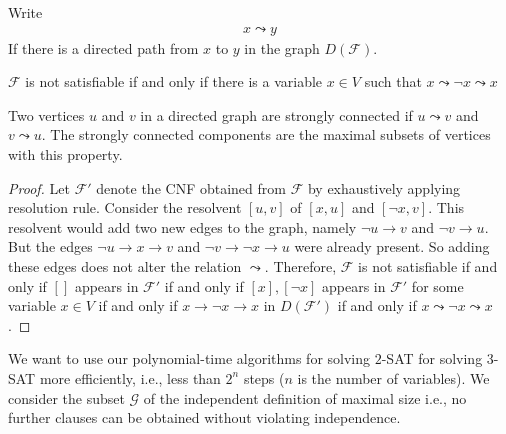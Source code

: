 \documentclass[a4paper]{article}
\theoremstyle{plain}
\newtheorem{lem}[thm]{Lemma}
\theoremstyle{definition}
\newtheorem{defn}{Definition}[section]
\theoremstyle{remark}
\begin{document}
\begin{tcolorbox}[colback=black!3!white,colframe=black!60!white,title=\begin{defn}Directed Path \label{Directed Path}\end{defn}]
Write
\begin{align}
x \leadsto y
\end{align}
If there is a directed path from $x$ to $y$ in the graph $D(\mathcal{F})$.
\end{tcolorbox}
\begin{tcolorbox}[colback=black!3!white,colframe=black!60!white,title=\begin{lem}Satisfiability for linear time \label{Satisfiability for linear time}\end{lem}]
        $\mathcal{F}$ is not satisfiable if and only if there is a variable $x \in V$ such that $x \leadsto \neg x \leadsto x$
\end{tcolorbox}
\begin{tcolorbox}[colback=black!3!white,colframe=black!60!white,title=\begin{defn}Strongly Connected \label{Strongly Connected}\end{defn}]
Two vertices $u$ and $v$ in a directed graph are strongly connected if $u \leadsto v$ and $v \leadsto u$. The strongly connected components are the maximal subsets of vertices with this property.
\begin{proof}
	Let $\mathcal{F}'$ denote the CNF obtained from $\mathcal{F}$ by exhaustively applying resolution rule. Consider the resolvent $[u,v]$ of $[x,u]$ and $[\neg x,v]$. This resolvent would add two new edges to the graph, namely $\neg u \to v$ and $\neg v \to  u$. But the edges $\neg u \to  x \to  v$ and $\neg v \to  \neg x \to  u$ were already present. So adding these edges does not alter the relation $\leadsto$.  Therefore, $\mathcal{F}$ is not satisfiable if and only if $[]$ appears in $\mathcal{F}'$ if and only if $[x], [\neg x]$ appears in $\mathcal{F}'$ for some variable $x \in V$ if and only if $x \to  \neg x \to x$ in $D(\mathcal{F}')$ if and only if  $x \leadsto \neg x \leadsto x$.
\end{proof}
\end{tcolorbox}
\begin{tcolorbox}[colback=black!3!white,colframe=black!60!white,title=\begin{defn}Applications to 3-SAT \label{Applications to 3-SAT}\end{defn}]
We want to use our polynomial-time algorithms for solving $2$-SAT for solving $3$-SAT more efficiently, i.e., less than $2^{n}$ steps ($n$ is the number of variables). We consider the subset $\mathcal{G}$ of the independent definition of maximal size i.e., no further clauses can be obtained without violating independence.
\end{tcolorbox}
\end{document}
